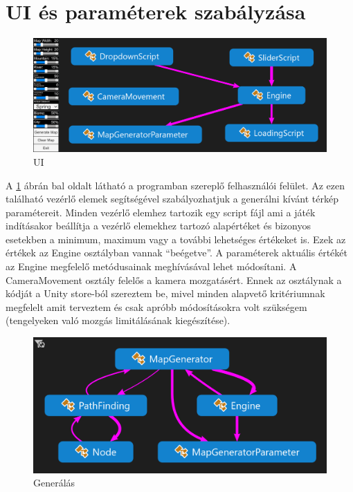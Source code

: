 \section{UI és paraméterek szabályzása}

\begin{figure}[h!]
\centering
\includegraphics[scale=0.37]{kepek/UI.png}
\caption{UI}
\label{fig:UI}
\end{figure}

\noindent A \ref{fig:UI} ábrán bal oldalt látható a programban szereplő felhasználói felület. Az ezen található vezérlő elemek segítségével szabályozhatjuk a generálni kívánt térkép paramétereit. Minden vezérlő elemhez tartozik egy script fájl ami a játék indításakor beállítja a vezérlő elemekhez tartozó alapértéket és bizonyos esetekben a minimum, maximum vagy a további lehetséges értékeket is. Ezek az értékek az Engine osztályban vannak “beégetve”. A paraméterek aktuális értékét az Engine megfelelő metódusainak meghívásával lehet módosítani.
\newline
\newline A CameraMovement osztály felelős a kamera mozgatásért. Ennek az osztálynak a kódját a Unity store-ból szereztem be, mivel minden alapvető kritériumnak megfelelt amit terveztem és csak apróbb módosításokra volt szükségem (tengelyeken való mozgás limitálásának kiegészítése). 

\begin{figure}[h!]
\centering
\includegraphics[scale=0.4]{kepek/generalas.png}
\caption{Generálás}
\label{fig:generalas}
\end{figure}

